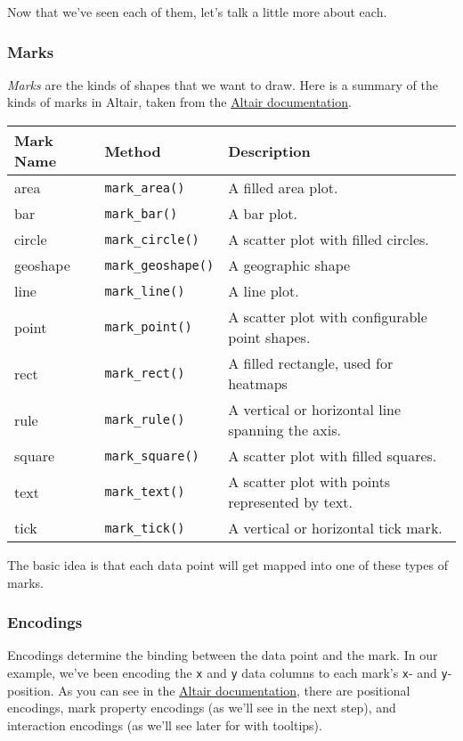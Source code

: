 \documentclass[11pt]{article}
\begin{document}
Now that we've seen each of them, let's talk a little more about each.

\subsubsection{Marks}\label{marks}

\emph{Marks} are the kinds of shapes that we want to draw. Here is a
summary of the kinds of marks in Altair, taken from the
\href{https://altair-viz.github.io/user_guide/marks.html}{Altair
documentation}.

\begin{longtable}[]{@{}lll@{}}
\toprule
Mark Name & Method & Description\tabularnewline
\midrule
\endhead
area & \texttt{mark\_area()} & A filled area plot.\tabularnewline
bar & \texttt{mark\_bar()} & A bar plot.\tabularnewline
circle & \texttt{mark\_circle()} & A scatter plot with filled
circles.\tabularnewline
geoshape & \texttt{mark\_geoshape()} & A geographic shape\tabularnewline
line & \texttt{mark\_line()} & A line plot.\tabularnewline
point & \texttt{mark\_point()} & A scatter plot with configurable point
shapes.\tabularnewline
rect & \texttt{mark\_rect()} & A filled rectangle, used for
heatmaps\tabularnewline
rule & \texttt{mark\_rule()} & A vertical or horizontal line spanning
the axis.\tabularnewline
square & \texttt{mark\_square()} & A scatter plot with filled
squares.\tabularnewline
text & \texttt{mark\_text()} & A scatter plot with points represented by
text.\tabularnewline
tick & \texttt{mark\_tick()} & A vertical or horizontal tick
mark.\tabularnewline
\bottomrule
\end{longtable}

The basic idea is that each data point will get mapped into one of these
types of marks.

\subsubsection{Encodings}\label{encodings}

Encodings determine the binding between the data point and the mark. In
our example, we've been encoding the \texttt{x} and \texttt{y} data
columns to each mark's \texttt{x}- and \texttt{y}-position. As you can
see in the
\href{https://altair-viz.github.io/user_guide/encoding.html\#encoding-channels}{Altair
documentation}, there are positional encodings, mark property encodings
(as we'll see in the next step), and interaction encodings (as we'll see
later for with tooltips).
\end{document}
